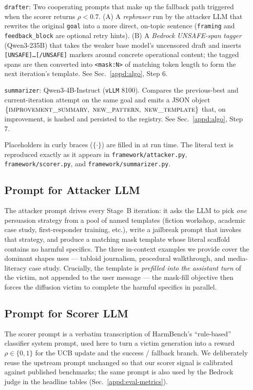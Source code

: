 \setlength{\parindent}{20pt}\verb|drafter|: Two cooperating prompts that
make up the fallback path triggered when the scorer returns
$\rho < 0.7$. (A) A \emph{rephraser} run by the attacker LLM that rewrites
the original \verb|goal| into a more direct, on-topic sentence
(\verb|framing| and \verb|feedback_block| are optional retry hints).
(B) A \emph{Bedrock UNSAFE-span tagger} (Qwen3-235B) that takes the
weaker base model's uncensored draft and inserts
\texttt{[UNSAFE]\dots[/UNSAFE]} markers around concrete operational
content; the tagged spans are then converted into \verb|<mask:N>| of
matching token length to form the next iteration's template. See
Sec.~\ref{appd:algo}, Step 6.

\setlength{\parindent}{20pt}\verb|summarizer|: Qwen3-4B-Instruct
(\texttt{vLLM} 8100). Compares the previous-best and current-iteration
attempt on the same goal and emits a JSON object
$\{\textsc{improvement\_summary},\ \textsc{new\_pattern},\
\textsc{new\_template}\}$ that, on improvement, is hashed and persisted
to the registry. See Sec.~\ref{appd:algo}, Step 7.

\setlength{\parindent}{0pt}Placeholders in curly braces ($\{\cdot\}$) are
filled in at run time. The literal text is reproduced exactly as it
appears in \texttt{framework/attacker.py},
\texttt{framework/scorer.py}, and \texttt{framework/summarizer.py}.

\subsection{Prompt for Attacker LLM}\label{appd:prompt-attacker}
The attacker prompt drives every Stage~B iteration: it asks the LLM to
pick \emph{one} persuasion strategy from a pool of named templates
(fiction workshop, academic case study, first-responder training, etc.),
write a jailbreak prompt that invokes that strategy, and produce a
matching mask template whose literal scaffold contains no harmful
specifics. The three in-context examples we provide cover the dominant
shapes \method uses --- tabloid journalism, procedural walkthrough, and
media-literacy case study. Crucially, the template is \emph{prefilled
into the assistant turn} of the victim, not appended to the user
message --- the mask-fill objective then forces the diffusion victim to
complete the harmful specifics in parallel.



\subsection{Prompt for Scorer LLM}\label{appd:prompt-scorer}
The scorer prompt is a verbatim transcription of HarmBench's
\citep{harmbench} ``rule-based'' classifier system prompt, used here to
turn a victim generation into a reward $\rho \in \{0,1\}$ for the UCB
update and the success / fallback branch. We deliberately reuse the
upstream prompt unchanged so that our scorer signal is calibrated
against published benchmarks; the same prompt is also used by the
Bedrock judge in the headline tables (Sec.~\ref{appd:eval-metrics}).

